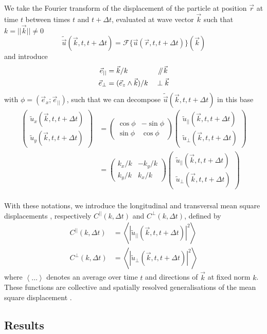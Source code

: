 \documentclass[class=report, float=false, crop=false]{standalone}
\begin{document}
We take the Fourier transform of the displacement of the particle at position $\vec{r}$ at time $t$ between times $t$ and $t + \Delta t$, evaluated at wave vector $\vec{k}$ such that $k = ||\vec{k}|| \neq 0$
\begin{equation}
\tilde{\vec{u}}(\vec{k}, t, t + \Delta t) = \mathcal{F}\{\vec{u}(\vec{r}, t, t + \Delta t)\}(\vec{k})
\end{equation}
and introduce
\begin{equation}
\begin{aligned}
\vec{e}_{||} &= \vec{k}/k &&~\mathbin{\!/\mkern-5mu/\!} \vec{k}\\
\vec{e}_{\perp} &= (\vec{e}_z\wedge\vec{k})/k &&\perp \vec{k}
\end{aligned}
\end{equation}
with $\phi = (\vec{e}_x ; \vec{e}_{||})$, such that we can decompose $\tilde{\vec{u}}(\vec{k}, t, t + \Delta t)$ in this base \cite{stackexchange}
\begin{equation}
\begin{aligned}
\begin{pmatrix} \tilde{u}_x(\vec{k}, t, t + \Delta t) \\ \tilde{u}_y(\vec{k}, t, t + \Delta t) \end{pmatrix} &= \begin{pmatrix} \cos\phi & -\sin\phi \\ \sin\phi & \cos\phi \end{pmatrix} \begin{pmatrix} \tilde{u}_{||}(\vec{k}, t, t + \Delta t) \\ \tilde{u}_{\perp}(\vec{k}, t, t + \Delta t) \end{pmatrix}\\
&= \begin{pmatrix} k_x/k & -k_y/k \\ k_y/k & k_x/k \end{pmatrix} \begin{pmatrix} \tilde{u}_{||}(\vec{k}, t, t + \Delta t) \\ \tilde{u}_{\perp}(\vec{k}, t, t + \Delta t) \end{pmatrix}
\end{aligned}
\end{equation}
\mbox{}\\

With these notations, we introduce the longitudinal and transversal mean square displacements \cite{illing2016strain, klix2012glass}, respectively $C^{||}(k, \Delta t)$ and $C^{\perp}(k, \Delta t)$, defined by
\begin{equation}
\begin{aligned}
C^{||}(k, \Delta t) &= \left<|\tilde{u}_{||}(\vec{k}, t, t + \Delta t)|^2\right>\\
C^{\perp}(k, \Delta t) &= \left<|\tilde{u}_{\perp}(\vec{k}, t, t + \Delta t)|^2\right>
\end{aligned}
\end{equation}
where $\left<\ldots\right>$ denotes an average over time $t$ and directions of $\vec{k}$ at fixed norm $k$. These functions are collective and spatially resolved generalisations of the mean square displacement \cite{illing2016strain}.



\subsection{Results}
\end{document}
